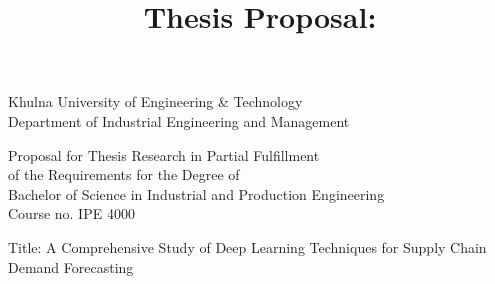 \documentclass[fontsize=11pt,paper=a4]{scrartcl}
\title{Thesis Proposal: \tltle}
\author{\asef}
\newcommand{\tltle}{A Comprehensive Study of Deep Learning Techniques for Supply Chain Demand Forecasting}
\begin{document}
\begin{spacing}{1}
    \begin{titlepage}
        \begin{center}
            Khulna University of Engineering \& Technology\\
            Department of Industrial Engineering and Management%
        \end{center}
        
        \begin{center}
            Proposal for Thesis Research in Partial Fulfillment\\
            of the Requirements for the Degree of\\
            Bachelor of Science in Industrial and Production Engineering\\
            \vspace{\baselineskip}
            Course no. IPE 4000
        \end{center}
        \vfill
        \begin{flushleft}
            Title: \tltle


\end{flushleft}
\end{titlepage}
\end{spacing}
\end{document}
